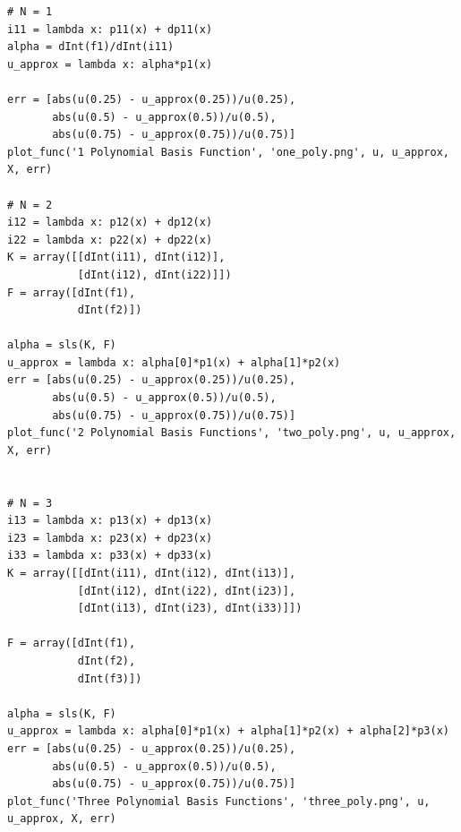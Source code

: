 \documentclass[10pt]{article}
\begin{document}
\begin{lstlisting}
# N = 1
i11 = lambda x: p11(x) + dp11(x)
alpha = dInt(f1)/dInt(i11)
u_approx = lambda x: alpha*p1(x)

err = [abs(u(0.25) - u_approx(0.25))/u(0.25), 
       abs(u(0.5) - u_approx(0.5))/u(0.5), 
       abs(u(0.75) - u_approx(0.75))/u(0.75)]
plot_func('1 Polynomial Basis Function', 'one_poly.png', u, u_approx, X, err)

# N = 2
i12 = lambda x: p12(x) + dp12(x)
i22 = lambda x: p22(x) + dp22(x)
K = array([[dInt(i11), dInt(i12)],
           [dInt(i12), dInt(i22)]])
F = array([dInt(f1),
           dInt(f2)])
            
alpha = sls(K, F)
u_approx = lambda x: alpha[0]*p1(x) + alpha[1]*p2(x)
err = [abs(u(0.25) - u_approx(0.25))/u(0.25),
       abs(u(0.5) - u_approx(0.5))/u(0.5),
       abs(u(0.75) - u_approx(0.75))/u(0.75)]
plot_func('2 Polynomial Basis Functions', 'two_poly.png', u, u_approx, X, err)


# N = 3
i13 = lambda x: p13(x) + dp13(x)
i23 = lambda x: p23(x) + dp23(x)
i33 = lambda x: p33(x) + dp33(x)
K = array([[dInt(i11), dInt(i12), dInt(i13)],
           [dInt(i12), dInt(i22), dInt(i23)],
           [dInt(i13), dInt(i23), dInt(i33)]])

F = array([dInt(f1),
           dInt(f2),
           dInt(f3)])
                       
alpha = sls(K, F)
u_approx = lambda x: alpha[0]*p1(x) + alpha[1]*p2(x) + alpha[2]*p3(x)
err = [abs(u(0.25) - u_approx(0.25))/u(0.25),
       abs(u(0.5) - u_approx(0.5))/u(0.5),
       abs(u(0.75) - u_approx(0.75))/u(0.75)]
plot_func('Three Polynomial Basis Functions', 'three_poly.png', u, u_approx, X, err)
\end{lstlisting}
\end{document}

